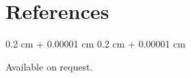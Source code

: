 \documentclass[10pt, letterpaper]{article}
\newenvironment{onecolentry}{
    \begin{adjustwidth}{
        0.2 cm + 0.00001 cm
    }{
        0.2 cm + 0.00001 cm
    }
}{
    \end{adjustwidth}
} %
\let\hrefWithoutArrow\href
\renewcommand{\href}[2]{\hrefWithoutArrow{#1}{\ifthenelse{\equal{#2}{}}{ }{#2 }\raisebox{.15ex}{\footnotesize \faExternalLink*}}}
\begin{document}
\section{References}
\begin{onecolentry}

    Available on request.


\end{onecolentry}
\end{document}
